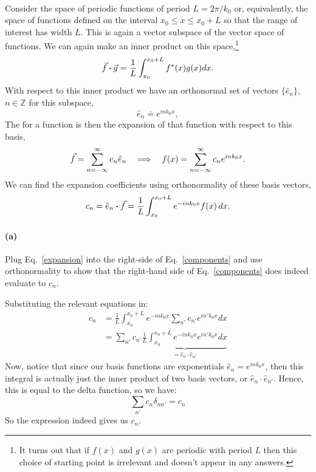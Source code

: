 \documentclass{article}
\begin{document}
\paragraph{}
Consider the space of periodic functions of period $L = 2\pi/k_{0}$ or, equivalently, the space of functions defined on the interval 
$x_{0} \leq x \leq x_{0}+L$ so that the range of interest has width $L$.   
This is again a vector subspace of the vector space of functions. 
We can again make an inner product on this space,\footnote{It turns out that if $f(x)$ and $g(x)$ are periodic with period $L$ then this choice of starting point is irrelevant and doesn't
appear in any answers.}
	\begin{equation*}
		\vec{f}\boldsymbol{\cdot}\vec{g} = \frac{1}{L}\int_{x_{0}}^{x_{0}+L} f^{*}(x)g(x)dx.
	\end{equation*}
With respect to this inner product we have an orthonormal set of vectors $\{\hat{e}_{n}\}$, $n\in\mathbb{Z}$ for this subspace,
	\begin{equation*}
		\hat{e}_{n} \doteq e^{ink_{0}x},
	\end{equation*}
The  for a function is then the expansion of that function with respect to this basis,
	\begin{equation}
		\vec{f} = \sum_{n=-\infty}^{\infty} c_{n}\hat{e}_{n} 	\quad \Longrightarrow \quad		f(x) = \sum_{n=-\infty}^{\infty}c_{n}e^{ink_{0}x}.
	\label{expansion}
	\end{equation}
We can find the expansion coefficients using orthonormality of these basis vectors,
	\begin{equation}
		c_{n} = \hat{e}_{n}\boldsymbol{\cdot}\vec{f} = \frac{1}{L}\int_{x_{0}}^{x_{0}+L}e^{-ink_{0}x}f(x)\,dx.
	\label{components}	
	\end{equation}

\paragraph{(a)}	
Plug Eq.~\ref{expansion} into the right-side of Eq.~\ref{components} and use orthonormality
to show that the right-hand side of Eq.~\ref{components} does indeed evaluate to $c_{n}$.

\begin{solution}
	Substituting the relevant equations in:
	\begin{align*}
		c_n &= \frac{1}{L}\int_{x_0}^{x_0+L} e^{-in k_0x} \sum_{n'} c_{n'} e^{i n' k_0x} dx\\
			&= \sum_{n'} c_{n'} \underbrace{\frac{1}{L}\int_{x_0}^{x_0+L} e^{-in k_0x} e^{in' k_0x} dx}_{=\hat{e}_n \cdot \hat{e}_{n'}}
	\end{align*}
	Now, notice that since our basis functions are exponentials $\hat{e}_n = e^{i nk_0x}$, then this integral
	is actually just the inner product of two basis vectors, or $\hat{e}_n \cdot \hat{e}_{n'}$. Hence, this 
	is equal to the delta function, so we have:
	\[
		\sum_{n'} c_n \delta_{nn'} = c_n
	\] 
	So the expression indeed gives us $c_n$. 
\end{solution}
\end{document}
